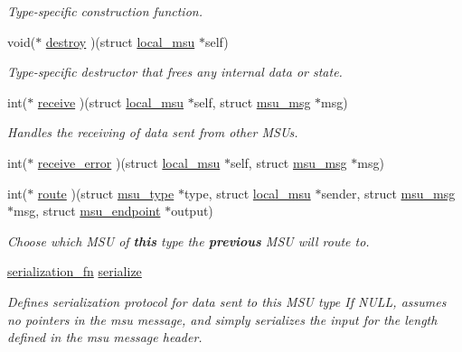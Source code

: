 \begin{DoxyCompactItemize}
\begin{DoxyCompactList}\small\item\em Type-\/specific construction function. \end{DoxyCompactList}\item 
void($\ast$ \hyperlink{structmsu__type_abfe698dd8e2d5ff6107f843c93927710}{destroy} )(struct \hyperlink{structlocal__msu}{local\-\_\-msu} $\ast$self)
\begin{DoxyCompactList}\small\item\em Type-\/specific destructor that frees any internal data or state. \end{DoxyCompactList}\item 
int($\ast$ \hyperlink{structmsu__type_a8e80deeae69a39533061d4407fa7c53d}{receive} )(struct \hyperlink{structlocal__msu}{local\-\_\-msu} $\ast$self, struct \hyperlink{structmsu__msg}{msu\-\_\-msg} $\ast$msg)
\begin{DoxyCompactList}\small\item\em Handles the receiving of data sent from other M\-S\-Us. \end{DoxyCompactList}\item 
int($\ast$ \hyperlink{structmsu__type_af38fab3cdee8b622e0bb3594c1d7414b}{receive\-\_\-error} )(struct \hyperlink{structlocal__msu}{local\-\_\-msu} $\ast$self, struct \hyperlink{structmsu__msg}{msu\-\_\-msg} $\ast$msg)
\item 
int($\ast$ \hyperlink{structmsu__type_ab076ecc00c1838c66351f51f9f2b684e}{route} )(struct \hyperlink{structmsu__type}{msu\-\_\-type} $\ast$type, struct \hyperlink{structlocal__msu}{local\-\_\-msu} $\ast$sender, struct \hyperlink{structmsu__msg}{msu\-\_\-msg} $\ast$msg, struct \hyperlink{structmsu__endpoint}{msu\-\_\-endpoint} $\ast$output)
\begin{DoxyCompactList}\small\item\em Choose which M\-S\-U of {\bfseries this} type the {\bfseries previous} M\-S\-U will route to. \end{DoxyCompactList}\item 
\hyperlink{msu__type_8h_a17ed2199cfcb2244df8020d04c232a78}{serialization\-\_\-fn} \hyperlink{structmsu__type_a47b8e5d5beb28f531665d60c6156ff39}{serialize}
\begin{DoxyCompactList}\small\item\em Defines serialization protocol for data sent to this M\-S\-U type If N\-U\-L\-L, assumes no pointers in the msu message, and simply serializes the input for the length defined in the msu message header. \end{DoxyCompactList}\item 

\end{DoxyCompactItemize}
